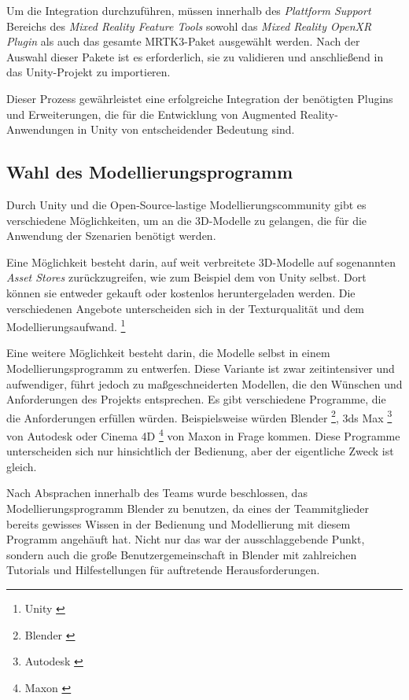 Um die Integration durchzuführen, müssen innerhalb des \textit{Plattform Support} Bereichs des \textit{Mixed Reality Feature Tools}
sowohl das \textit{Mixed Reality OpenXR Plugin} als auch das gesamte MRTK3-Paket ausgewählt werden. Nach der Auswahl
dieser Pakete ist es erforderlich, sie zu validieren und anschließend in das Unity-Projekt zu importieren.

Dieser Prozess gewährleistet eine erfolgreiche Integration der benötigten Plugins und Erweiterungen, die für die Entwicklung
von Augmented Reality-Anwendungen in Unity von entscheidender Bedeutung sind.

\subsection{Wahl des Modellierungsprogramm}
Durch Unity und die Open-Source-lastige Modellierungscommunity gibt es verschiedene Möglichkeiten, um an die 3D-Modelle
zu gelangen, die für die Anwendung der Szenarien benötigt werden.

Eine Möglichkeit besteht darin, auf weit verbreitete 3D-Modelle auf sogenannten \textit{Asset Stores} zurückzugreifen,
wie zum Beispiel dem von Unity selbst. Dort können sie entweder gekauft oder kostenlos heruntergeladen werden. Die
verschiedenen Angebote unterscheiden sich in der Texturqualität und dem Modellierungsaufwand.
\footnote{Unity \cite{Asset Stores}}

Eine weitere Möglichkeit besteht darin, die Modelle selbst in einem Modellierungsprogramm zu entwerfen. Diese Variante
ist zwar zeitintensiver und aufwendiger, führt jedoch zu maßgeschneiderten Modellen, die den Wünschen und Anforderungen
des Projekts entsprechen. Es gibt verschiedene Programme, die die Anforderungen erfüllen würden. Beispielsweise würden
Blender \footnote{Blender \cite{Blender Allgemein}}, 3ds Max \footnote{Autodesk \cite{3DS Max}} von Autodesk oder
Cinema 4D \footnote{Maxon \cite{Cinema 4D}} von Maxon in Frage kommen. Diese Programme unterscheiden sich nur hinsichtlich
der Bedienung, aber der eigentliche Zweck ist gleich.

Nach Absprachen innerhalb des Teams wurde beschlossen, das Modellierungsprogramm Blender zu benutzen, da eines der
Teammitglieder bereits gewisses Wissen in der Bedienung und Modellierung mit diesem Programm angehäuft hat. Nicht nur
das war der ausschlaggebende Punkt, sondern auch die große Benutzergemeinschaft in Blender mit zahlreichen Tutorials
und Hilfestellungen für auftretende Herausforderungen.

